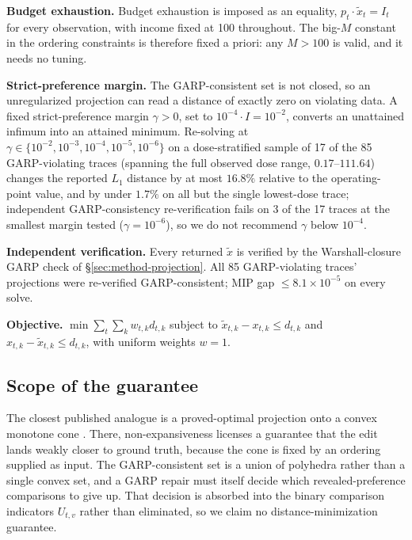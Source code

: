 \documentclass{article}
\begin{document}
\textbf{Budget exhaustion.} Budget exhaustion is imposed as an equality,
$p_t \cdot \tilde{x}_t = I_t$ for every observation, with income fixed at 100 throughout. The
big-$M$ constant in the ordering constraints is therefore fixed a priori: any $M > 100$ is valid,
and it needs no tuning.

\textbf{Strict-preference margin.} The GARP-consistent set is not closed, so an unregularized
projection can read a distance of exactly zero on violating data. A fixed strict-preference margin
$\gamma > 0$, set to $10^{-4}\cdot I = 10^{-2}$, converts an unattained infimum into an attained
minimum. Re-solving at $\gamma \in \{10^{-2}, 10^{-3}, 10^{-4}, 10^{-5}, 10^{-6}\}$ on a
dose-stratified sample of 17 of the 85 GARP-violating traces (spanning the full observed dose
range, $0.17$--$111.64$) changes the reported $L_1$ distance by at most $16.8\%$ relative to the
operating-point value, and by under $1.7\%$ on all but the single lowest-dose trace; independent
GARP-consistency re-verification fails on 3 of the 17 traces at the smallest margin tested
($\gamma=10^{-6}$), so we do not recommend $\gamma$ below $10^{-4}$.

\textbf{Independent verification.} Every returned $\tilde{x}$ is verified by the
Warshall-closure \citep{warshall1962theorem} GARP check of \S\ref{sec:method-projection}. All 85
GARP-violating traces' projections were re-verified GARP-consistent; MIP gap
$\le 8.1\times10^{-5}$ on every solve.

\textbf{Objective.} $\min \sum_t\sum_k w_{t,k} d_{t,k}$ subject to
$\tilde{x}_{t,k}-x_{t,k}\le d_{t,k}$ and $x_{t,k}-\tilde{x}_{t,k}\le d_{t,k}$, with uniform weights
$w=1$.

\subsection{Scope of the guarantee}
\label{app:guarantee}

The closest published analogue is a proved-optimal projection onto a convex monotone cone
\citep{wang2026poise}. There, non-expansiveness licenses a guarantee that the edit lands weakly
closer to ground truth, because the cone is fixed by an ordering supplied as input. The
GARP-consistent set is
a union of polyhedra rather than a single convex set, and a GARP repair must itself decide which
revealed-preference comparisons to give up. That decision is absorbed into the binary comparison
indicators $U_{t,v}$ rather than eliminated, so we claim no distance-minimization guarantee.

\newpage

\end{document}
